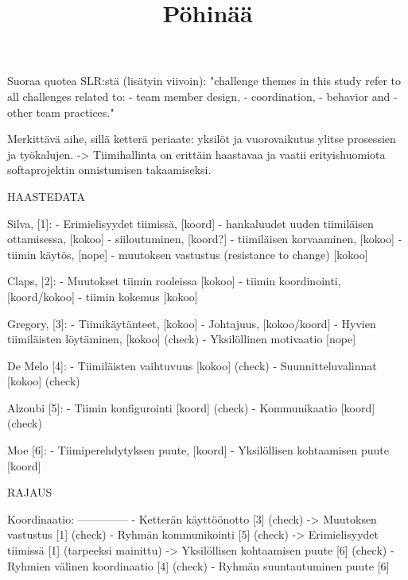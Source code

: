 \title{Pöhinää}

Suoraa quotea SLR:stä (lisätyin viivoin): 
"challenge themes in this study refer to all challenges related to:
- team member design, 
- coordination, 
- behavior and 
- other team practices."

Merkittävä aihe, sillä ketterä periaate: yksilöt ja vuorovaikutus ylitse prosessien ja työkalujen.
-> Tiimihallinta on erittäin haastavaa ja vaatii erityishuomiota softaprojektin onnistumisen takaamiseksi.

            HAASTEDATA

Silva,      [1]: 
- Erimielisyydet tiimissä,                      [koord]
- hankaluudet uuden tiimiläisen ottamisessa,    [kokoo]
- siiloutuminen,                                [koord?]
- tiimiläisen korvaaminen,                      [kokoo]
- tiimin käytös,                                [nope]
- muutoksen vastustus (resistance to change)    [kokoo]

Claps,      [2]:
- Muutokset tiimin rooleissa                    [kokoo]
- tiimin koordinointi,                          [koord/kokoo]
- tiimin kokemus                                [kokoo]

Gregory,    [3]:
- Tiimikäytänteet,                              [kokoo]
- Johtajuus,                                    [kokoo/koord]
- Hyvien tiimiläisten löytäminen,               [kokoo] (check)
- Yksilöllinen motivaatio                       [nope]

De Melo     [4]:
- Tiimiläisten vaihtuvuus                       [kokoo] (check)
- Suunnitteluvalinnat                           [kokoo] (check)

Alzoubi     [5]:
- Tiimin konfigurointi                          [koord] (check)
- Kommunikaatio                                 [koord] (check)

Moe         [6]:
- Tiimiperehdytyksen puute,                     [koord]
- Yksilöllisen kohtaamisen puute                [koord]

    RAJAUS

Koordinaatio:
--------------
- Ketterän käyttöönotto                     [3] (check)
    -> Muutoksen vastustus                  [1] (check)
- Ryhmän kommunikointi                      [5] (check)
    -> Erimielisyydet tiimissä              [1] (tarpeeksi mainittu)
    -> Yksilöllisen kohtaamisen puute       [6] (check)
- Ryhmien välinen koordinaatio              [4] (check)
- Ryhmän suuntautuminen puute               [6] 

